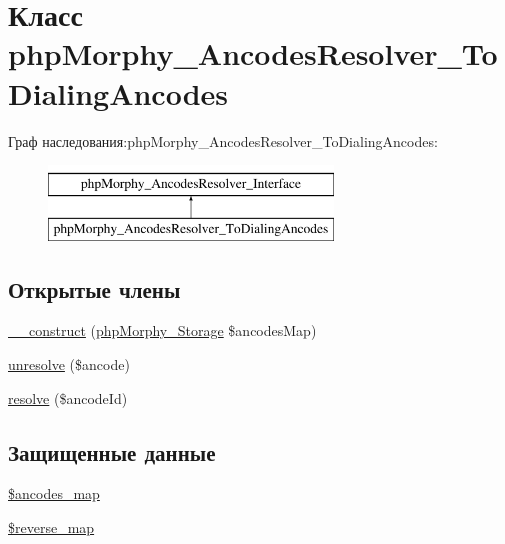 \hypertarget{classphpMorphy__AncodesResolver__ToDialingAncodes}{
\section{Класс phpMorphy\_\-AncodesResolver\_\-ToDialingAncodes}
\label{classphpMorphy__AncodesResolver__ToDialingAncodes}
}
Граф наследования:phpMorphy\_\-AncodesResolver\_\-ToDialingAncodes:\begin{figure}[H]
\begin{center}
\leavevmode
\includegraphics[height=2.000000cm]{classphpMorphy__AncodesResolver__ToDialingAncodes}
\end{center}
\end{figure}
\subsection*{Открытые члены}
\begin{DoxyCompactItemize}
\item 
\hyperlink{classphpMorphy__AncodesResolver__ToDialingAncodes_a316bec2aa5b5cde9b99dced3de523036}{\_\-\_\-construct} (\hyperlink{classphpMorphy__Storage}{phpMorphy\_\-Storage} \$ancodesMap)
\item 
\hyperlink{classphpMorphy__AncodesResolver__ToDialingAncodes_a5b2f2972433af449d21496b31f664d63}{unresolve} (\$ancode)
\item 
\hyperlink{classphpMorphy__AncodesResolver__ToDialingAncodes_a88d43fceb36ed5e61dcebbe358c605e8}{resolve} (\$ancodeId)
\end{DoxyCompactItemize}
\subsection*{Защищенные данные}
\begin{DoxyCompactItemize}
\item 
\hyperlink{classphpMorphy__AncodesResolver__ToDialingAncodes_aad08246bf01a52196103a388961cf692}{\$ancodes\_\-map}
\item 
\hyperlink{classphpMorphy__AncodesResolver__ToDialingAncodes_aafd2110d246494da8771a3b5248f5f59}{\$reverse\_\-map}
\end{DoxyCompactItemize}


